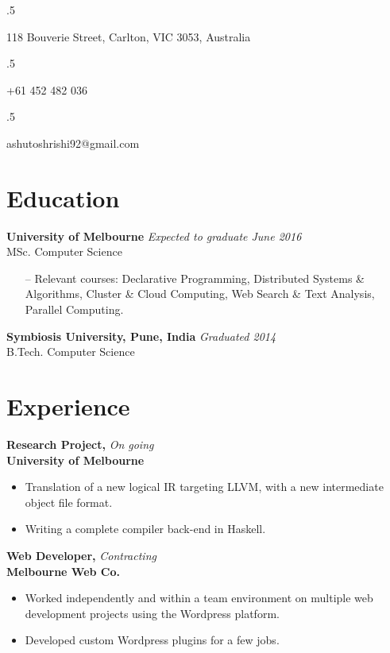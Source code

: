 \documentclass[overlapped]{res}
\begin{document}


\begin{resume}
  \moveleft.5\hoffset\centerline{118 Bouverie Street, Carlton, VIC 3053, Australia}
  \moveleft.5\hoffset\centerline{+61 452 482 036}
  \moveleft.5\hoffset\centerline{ashutoshrishi92@gmail.com}
  
  \section{Education}  
  \textbf{University of Melbourne} \hfill \textit{Expected to graduate June 2016} \\
  MSc. Computer Science 
  \begin{itemize} \itemsep -2pt
  \item[--] Relevant courses: Declarative Programming, Distributed Systems \&\\ 
    Algorithms, Cluster \& Cloud Computing, Web Search \& Text Analysis, \\ 
    Parallel Computing.
  \end{itemize}

  \textbf{Symbiosis University, Pune, India} \hfill \textit{Graduated 2014} \\
  B.Tech. Computer Science 


  \section{Experience}
  \textbf{Research Project,} \hfill \textit{On going}\\
  \textbf{University of Melbourne}
  \begin{itemize}
  \item Translation of a new logical IR targeting LLVM, with a new intermediate
    object file format. 
  \item Writing a complete compiler back-end in Haskell. 
  \end{itemize}

  \textbf{Web Developer,} \hfill \textit{Contracting}\\
  \textbf{Melbourne Web Co.}
  \begin{itemize}
  \item Worked independently and within a team environment on multiple web 
    development projects using the Wordpress platform.
  \item Developed custom Wordpress plugins for a few jobs.  
  \end{itemize}


\end{resume}
\end{document}
